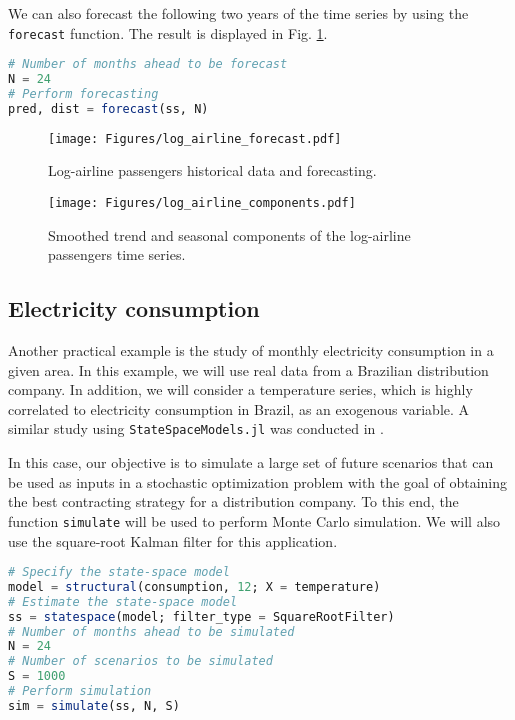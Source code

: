 \documentclass{juliacon}
\begin{document}
We can also forecast the following two years of the time series by using the \texttt{forecast} function. The result is displayed in Fig. \ref{fig:log_airline_forecast}.
%
\begin{lstlisting}[language = Julia]
# Number of months ahead to be forecast
N = 24
# Perform forecasting
pred, dist = forecast(ss, N)
\end{lstlisting}
%
\begin{figure}[h]
	\centering
	\texttt{[image: Figures/log\_airline\_forecast.pdf]}
	\caption{Log-airline passengers historical data and forecasting.}
	\label{fig:log_airline_forecast}
\end{figure}
%
\begin{figure}[h]
	\centering
	\texttt{[image: Figures/log\_airline\_components.pdf]}
	\caption{Smoothed trend and seasonal components of the log-airline passengers time series.}
	\label{fig:log_airline_components}
\end{figure}

\subsection{Electricity consumption}

Another practical example is the study of monthly electricity consumption in a given area. In this example, we will use real data from a Brazilian distribution company. In addition, we will consider a temperature series, which is highly correlated to electricity consumption in Brazil, as an exogenous variable. A similar study using \texttt{StateSpaceModels.jl} was conducted in \cite{saavedra2018simulating}.

In this case, our objective is to simulate a large set of future scenarios that can be used as inputs in a stochastic optimization problem with the goal of obtaining the best contracting strategy for a distribution company. To this end, the function \texttt{simulate} will be used to perform Monte Carlo simulation. We will also use the square-root Kalman filter for this application.
%
\begin{lstlisting}[language = Julia]
# Specify the state-space model
model = structural(consumption, 12; X = temperature)
# Estimate the state-space model
ss = statespace(model; filter_type = SquareRootFilter)
# Number of months ahead to be simulated
N = 24
# Number of scenarios to be simulated
S = 1000
# Perform simulation
sim = simulate(ss, N, S)
\end{lstlisting}
\end{document}
